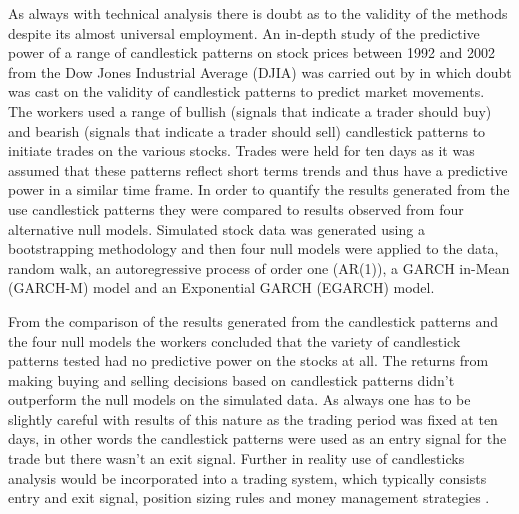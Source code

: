 As always with technical analysis there is doubt as to the validity of the methods despite its almost universal employment. An in-depth study of the predictive power of a range of candlestick patterns on stock prices between 1992 and 2002 from the Dow Jones Industrial Average (DJIA) was carried out by \citep{Marshall20062303} in which doubt was cast on the validity of candlestick patterns to predict market movements. The workers used a range of bullish (signals that indicate a trader should buy) and bearish (signals that indicate a trader should sell) candlestick patterns to initiate trades on the various stocks. Trades were held for ten days as it was assumed that these patterns reflect short terms trends and thus have a predictive power in a similar time frame. In order to quantify the results generated from the use candlestick patterns they were compared to results observed from four alternative null models. Simulated stock data was generated using a bootstrapping methodology \citep{EfronBootstrapping} and then four null models were applied to the data, random walk, an autoregressive process of order one (AR(1)), a GARCH in-Mean (GARCH-M) model and an Exponential GARCH (EGARCH) model.

From the comparison of the results generated from the candlestick patterns and the four null models the workers concluded that the variety of candlestick patterns tested had no predictive power on the stocks at all. The returns from making buying and selling decisions based on candlestick patterns didn't outperform the null models on the simulated data. As always one has to be slightly careful with results of this nature as the trading period was fixed at ten days, in other words the candlestick patterns were used as an entry signal for the trade but there wasn't an exit signal. Further in reality use of candlesticks analysis would be incorporated into a trading system, which typically consists entry and exit signal, position sizing rules and money management strategies \citep{faith2007way}.

